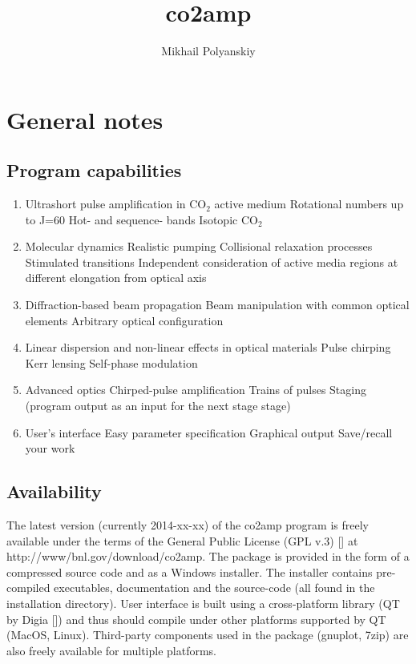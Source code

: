 \documentclass{report}
\begin{document}
\title{co2amp}
\author{Mikhail Polyanskiy}
\maketitle

\tableofcontents

\chapter{General notes}

\section{Program capabilities}
\begin{enumerate}
\item Ultrashort pulse amplification in CO$_2$ active medium
\subitem Rotational numbers up to J=60
\subitem Hot- and sequence- bands
\subitem Isotopic CO$_2$
\item Molecular dynamics
\subitem Realistic pumping
\subitem Collisional relaxation processes
\subitem Stimulated transitions
\subitem Independent consideration of active media regions at different elongation from optical axis
\item Diffraction-based beam propagation
\subitem Beam manipulation with common optical elements
\subitem Arbitrary optical configuration
\item Linear dispersion and non-linear effects in optical materials
\subitem Pulse chirping
\subitem Kerr lensing
\subitem Self-phase modulation
\item Advanced optics
\subitem Chirped-pulse amplification
\subitem Trains of pulses
\subitem Staging (program output as an input for the next stage stage)
\item User's interface
\subitem Easy parameter specification
\subitem Graphical output
\subitem Save/recall your work
\end{enumerate}

\section{Availability}
The latest version (currently 2014-xx-xx) of the co2amp program is freely available under the terms of the General Public License (GPL v.3) [] at http://www/bnl.gov/download/co2amp. The package is provided in the form of a compressed source code and as a Windows installer. The installer contains pre-compiled executables, documentation and the source-code (all found in the installation directory). User interface is built using a cross-platform library (QT by Digia []) and thus should compile under other platforms supported by QT (MacOS, Linux). Third-party components used in the package (gnuplot, 7zip) are also freely available for multiple platforms.
\end{document}
